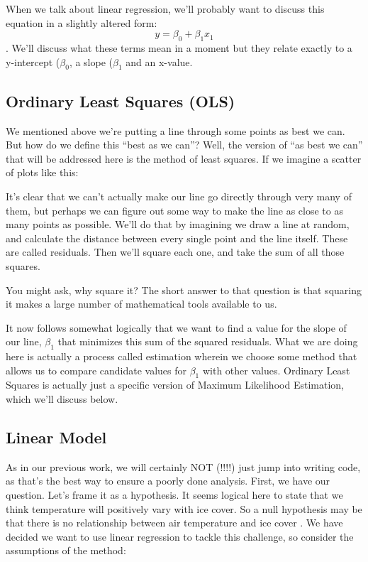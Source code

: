 \documentclass[
]{article}
\begin{document}
When we talk about linear regression, we'll probably want to discuss
this equation in a slightly altered form: \[y = \beta_0 + \beta_1 x_1\].
We'll discuss what these terms mean in a moment but they relate exactly
to a y-intercept (\(\beta_0\), a slope (\(\beta_1\) and an x-value.

\hypertarget{ordinary-least-squares-ols}{%
\subsection{Ordinary Least Squares
(OLS)}\label{ordinary-least-squares-ols}}

We mentioned above we're putting a line through some points as best we
can. But how do we define this ``best as we can''? Well, the version of
``as best we can'' that will be addressed here is the method of least
squares. If we imagine a scatter of plots like this:

It's clear that we can't actually make our line go directly through very
many of them, but perhaps we can figure out some way to make the line as
close to as many points as possible. We'll do that by imagining we draw
a line at random, and calculate the distance between every single point
and the line itself. These are called residuals. Then we'll square each
one, and take the sum of all those squares.

You might ask, why square it? The short answer to that question is that
squaring it makes a large number of mathematical tools available to us.

It now follows somewhat logically that we want to find a value for the
slope of our line, \(\beta_1\) that minimizes this sum of the squared
residuals. What we are doing here is actually a process called
estimation wherein we choose some method that allows us to compare
candidate values for \(\beta_1\) with other values. Ordinary Least
Squares is actually just a specific version of Maximum Likelihood
Estimation, which we'll discuss below.

\hypertarget{linear-model}{%
\subsection{Linear Model}\label{linear-model}}

As in our previous work, we will certainly NOT (!!!!) just jump into
writing code, as that's the best way to ensure a poorly done analysis.
First, we have our question. Let's frame it as a hypothesis. It seems
logical here to state that we think temperature will positively vary
with ice cover. So a null hypothesis may be that there is no
relationship between air temperature and ice cover . We have decided we
want to use linear regression to tackle this challenge, so consider the
assumptions of the method:
\end{document}
